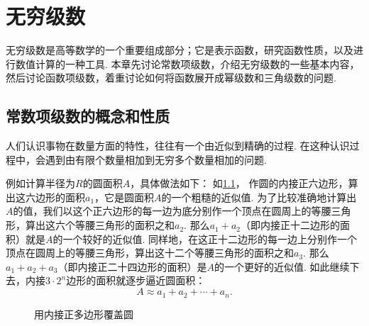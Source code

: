 \begingroup
\def\s{\sum\limits_{i=1}^\infty }
\renewcommand{\s}[1][1]{\sum\limits_{i=#1}^\infty }%
\def\sn{\sum\limits_{i=1}^n}
\def\l{\lim\limits_{n\to\infty}}
\def\tint{\int_{-\pi}^{\pi}}

\chapter{无穷级数}
无穷级数是高等数学的一个重要组成部分；它是表示函数，研究函数性质，以及进行数值计算的一种工具.
本章先讨论常数项级数，介绍无穷级数的一些基本内容，然后讨论函数项级数，着重讨论如何将函数展开成幂级数和三角级数的问题.

\section{常数项级数的概念和性质}
人们认识事物在数量方面的特性，往往有一个由近似到精确的过程.
在这种认识过程中，会遇到由有限个数量相加到无穷多个数量相加的问题.

例如计算半径为\(R\)的圆面积\(A\)，具体做法如下：
如\cref{figure:无穷级数.用内接正多边形覆盖圆}，%
作圆的内接正六边形，算出这六边形的面积\(a_1\)，它是圆面积\(A\)的一个粗糙的近似值.
为了比较准确地计算出\(A\)的值，我们以这个正六边形的每一边为底分别作一个顶点在圆周上的等腰三角形，算出这六个等腰三角形的面积之和\(a_2\).
那么\(a_1+a_2\)（即内接正十二边形的面积）就是\(A\)的一个较好的近似值.
同样地，在这正十二边形的每一边上分别作一个顶点在圆周上的等腰三角形，算出这十二个等腰三角形的面积之和\(a_3\).
那么\(a_1+a_2+a_3\)（即内接正二十四边形的面积）是\(A\)的一个更好的近似值.
如此继续下去，内接\(3\cdot2^n\)边形的面积就逐步逼近圆面积：\[
A \approx a_1 + a_2 + \dotsb + a_n.
\]

\begin{figure}[h]
	\centering
	\caption{用内接正多边形覆盖圆}
	\label{figure:无穷级数.用内接正多边形覆盖圆}
\end{figure}

